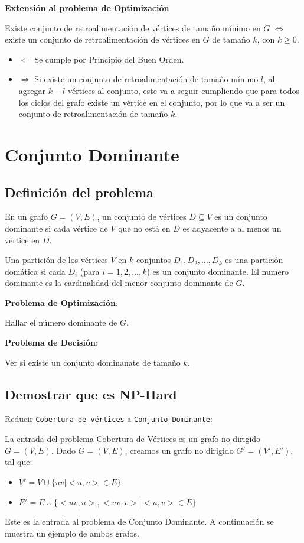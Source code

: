 \documentclass{article}
\begin{document}
\textbf{Extensión al problema de Optimización}

Existe conjunto de retroalimentación de vértices  de tamaño mínimo en \(G\) \(\iff\) existe un conjunto de retroalimentación de vértices en \(G\) de tamaño \(k\), con \(k \geq 0\).
\begin{itemize}
    \item \(\Leftarrow\) 
    Se cumple por Principio del Buen Orden.
    \item \(\Rightarrow\) 
    Si existe un conjunto de retroalimentación de tamaño mínimo \(l\), al agregar \(k-l\) vértices al conjunto, este va a seguir cumpliendo que para todos los ciclos del grafo existe un vértice en el conjunto, por lo que va a ser un conjunto de retroalimentación de tamaño \(k\).
\end{itemize}

\section{Conjunto Dominante}

    \subsection{Definición del problema}
    En un grafo $G=(V,E)$, un conjunto de vértices $D \subseteq V$ es un conjunto dominante si cada vértice de $V$ que no está en $D$ es adyacente a al menos un vértice en $D$.

    Una partición de los vértices $V$ en $k$ conjuntos $D_1,D_2,…,D_k$ es una partición domática si cada $D_i$ (para $i=1,2,…,k$) es un conjunto dominante. El numero dominante es la cardinalidad del menor conjunto dominante de $G$.

    \textbf{Problema de Optimización}:
    
    Hallar el número dominante de $G$.

    \textbf{Problema de Decisión}:
    
    Ver si existe un conjunto dominanate de tamaño $k$.
    

\subsection{Demostrar que es NP-Hard}
Reducir \texttt{Cobertura de vértices} a \texttt{Conjunto Dominante}:

La entrada del problema Cobertura de Vértices es un grafo no dirigido $G=(V,E)$. Dado $G=(V,E)$, creamos un grafo no dirigido $G'=(V',E')$, tal que:
\begin{itemize}
    \item \(V' = V \cup \{ uv | <u,v> \in E\}\)
    \item \(E' = E \cup \{ <uv,u>, <uv,v> | <u,v> \in E\}\)
\end{itemize}
Este es la entrada al problema de Conjunto Dominante. A continuación se muestra un ejemplo de ambos grafos.
\end{document}

